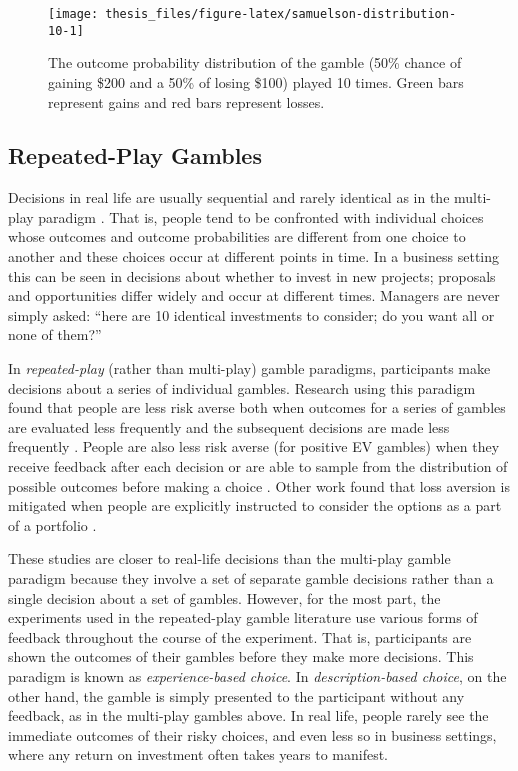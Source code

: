\documentclass[a4paper, nobind]{templates/ociamthesis}
\theoremstyle{definition}
\theoremstyle{definition}
\theoremstyle{definition}
\theoremstyle{definition}
\theoremstyle{remark}
\begin{document}
\begin{figure}
\texttt{[image: thesis\_files/figure-latex/samuelson-distribution-10-1]} \caption{The outcome probability distribution of the \textcite{samuelson1963} gamble (50\% chance of gaining \$200 and a 50\% of losing \$100) played 10 times. Green bars represent gains and red bars represent losses.}\label{fig:samuelson-distribution-10}
\end{figure}

\subsection{Repeated-Play Gambles}

Decisions in real life are usually sequential and rarely identical as in the
multi-play paradigm \autocite[cf.~][]{barron2003}. That is, people tend to be confronted
with individual choices whose outcomes and outcome probabilities are different
from one choice to another and these choices occur at different points in time.
In a business setting this can be seen in decisions about whether to invest in
new projects; proposals and opportunities differ widely and occur at different
times. Managers are never simply asked: ``here are 10 identical investments to
consider; do you want all or none of them?''

In \emph{repeated-play} (rather than multi-play) gamble paradigms, participants make
decisions about a series of individual gambles. Research using this paradigm
found that people are less risk averse both when outcomes for a series of
gambles are evaluated less frequently and the subsequent decisions are made less
frequently \autocite{gneezy1997,thaler1997,bellemare2005,beshears2016}. People are
also less risk averse (for positive EV gambles) when they receive feedback after
each decision or are able to sample from the distribution of possible outcomes
before making a choice \autocite{camilleri2011,camilleri2013,barron2003,wulff2018,ludvig2011,hertwig2004,jessup2008}. Other work found that loss aversion is
mitigated when people are explicitly instructed to consider the options as a
part of a portfolio \autocite{sokolhessner2009,sokolhessner2012}.

These studies are closer to real-life decisions than the multi-play gamble
paradigm because they involve a set of separate gamble decisions rather than a
single decision about a set of gambles. However, for the most part, the
experiments used in the repeated-play gamble literature use various forms of
feedback throughout the course of the experiment. That is, participants are
shown the outcomes of their gambles before they make more decisions. This
paradigm is known as \emph{experience-based choice}. In \emph{description-based choice},
on the other hand, the gamble is simply presented to the participant without any
feedback, as in the multi-play gambles above. In real life, people rarely see
the immediate outcomes of their risky choices, and even less so in business
settings, where any return on investment often takes years to manifest.
\end{document}
